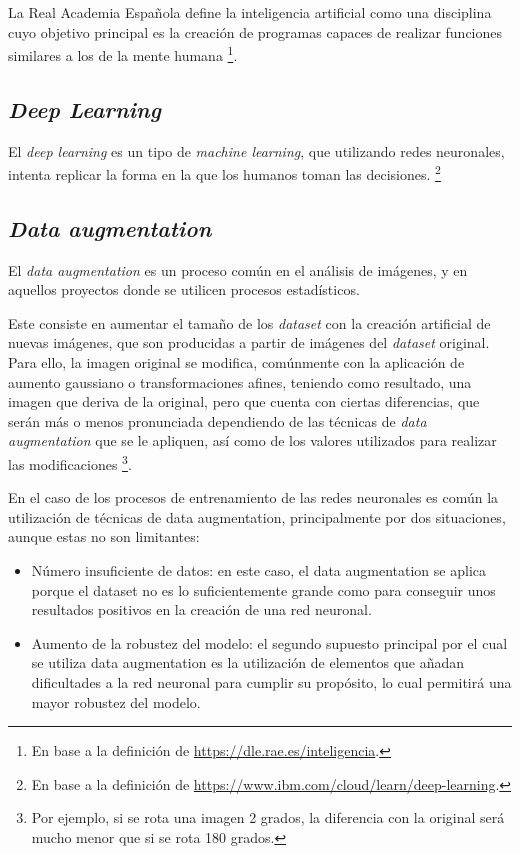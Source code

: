 La Real Academia Española define la inteligencia artificial como una disciplina cuyo objetivo principal es la creación de programas capaces de realizar funciones similares a los de la mente humana \footnote{En base a la definición de \url{https://dle.rae.es/inteligencia}.}.

\subsection{\textit{Deep Learning}}

El \textit{deep learning} es un tipo de \textit{machine learning}, que utilizando redes neuronales, intenta replicar la forma en la que los humanos toman las decisiones. \footnote{En base a la definición de \url{https://www.ibm.com/cloud/learn/deep-learning}.}

\subsection{\textit{Data augmentation}}\label{dataaugmentation}

El \textit{data augmentation} es un proceso común en el análisis de imágenes, y en aquellos proyectos donde se utilicen procesos estadísticos. 

Este consiste en aumentar el tamaño de los \textit{dataset} con la creación artificial de nuevas imágenes, que son producidas a partir de imágenes del \textit{dataset} original.
Para ello, la imagen original se modifica, comúnmente con la aplicación de aumento gaussiano o transformaciones afines, teniendo como resultado, una imagen que deriva de la original, pero que cuenta con ciertas diferencias, que serán más o menos pronunciada dependiendo de las técnicas 
de \textit{data augmentation} que se le apliquen, así como de los valores utilizados para realizar las modificaciones \footnote{Por ejemplo, si se rota una imagen 2 grados, la diferencia con la original será mucho menor que si se rota 180 grados.}.	

En el caso de los procesos de entrenamiento de las redes neuronales es común
la utilización de técnicas de data augmentation, principalmente por dos situaciones, aunque estas no son limitantes:

\begin{itemize}
	\item Número insuficiente de datos: en este caso, el data augmentation se aplica porque el dataset no es lo suficientemente grande como para conseguir unos resultados 
positivos en la creación de una red neuronal.
	\item Aumento de la robustez del modelo: el segundo supuesto principal por el cual se utiliza data augmentation es la utilización de elementos que añadan dificultades a la
red neuronal para cumplir su propósito, lo cual permitirá una mayor robustez del modelo.
\end{itemize}

